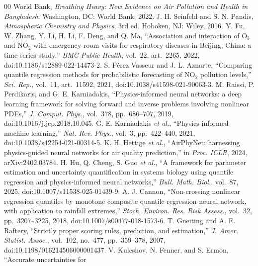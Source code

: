 \documentclass[conference]{IEEEtran}
\begin{document}
\scriptsize
\begin{thebibliography}{00}
\setlength{\itemsep}{0pt}\setlength{\parsep}{0pt}\setlength{\parskip}{0pt}
 World Bank, \emph{Breathing Heavy: New Evidence on Air Pollution
and Health in Bangladesh}. Washington, DC: World Bank, 2022.
 J. H. Seinfeld and S. N. Pandis, \emph{Atmospheric Chemistry and
Physics}, 3rd ed. Hoboken, NJ: Wiley, 2016.
 Y. Fu, W. Zhang, Y. Li, H. Li, F. Deng, and Q. Ma, ``Association and
interaction of $\mathrm{O_3}$ and $\mathrm{NO_2}$ with emergency room visits for
respiratory diseases in Beijing, China: a time-series study,'' \emph{BMC Public Health},
vol.~22, art.~2265, 2022, doi:10.1186/s12889-022-14473-2.
 S. P\'erez Vasseur and J. L. Aznarte, ``Comparing quantile
regression methods for probabilistic forecasting of $\mathrm{NO_2}$ pollution levels,''
\emph{Sci. Rep.}, vol.~11, art.~11592, 2021, doi:10.1038/s41598-021-90063-3.
 M. Raissi, P. Perdikaris, and G. E. Karniadakis, ``Physics-informed
neural networks: a deep learning framework for solving forward and inverse problems
involving nonlinear PDEs,'' \emph{J. Comput. Phys.}, vol.~378, pp.~686--707, 2019,
doi:10.1016/j.jcp.2018.10.045.
 G. E. Karniadakis \emph{et al.}, ``Physics-informed machine
learning,'' \emph{Nat. Rev. Phys.}, vol.~3, pp.~422--440, 2021,
doi:10.1038/s42254-021-00314-5.
 K. H. Hettige \emph{et al.}, ``AirPhyNet: harnessing physics-guided
neural networks for air quality prediction,'' in \emph{Proc. ICLR}, 2024,
arXiv:2402.03784.
 H. Hu, Q. Cheng, S. Guo \emph{et al.}, ``A framework for parameter
estimation and uncertainty quantification in systems biology using quantile regression and
physics-informed neural networks,'' \emph{Bull. Math. Biol.}, vol.~87, 2025,
doi:10.1007/s11538-025-01439-9.
 A. J. Cannon, ``Non-crossing nonlinear regression quantiles by
monotone composite quantile regression neural network, with application to rainfall
extremes,'' \emph{Stoch. Environ. Res. Risk Assess.}, vol.~32, pp.~3207--3225, 2018,
doi:10.1007/s00477-018-1573-6.
 T. Gneiting and A. E. Raftery, ``Strictly proper scoring rules,
prediction, and estimation,'' \emph{J. Amer. Statist. Assoc.}, vol.~102, no.~477,
pp.~359--378, 2007, doi:10.1198/016214506000001437.
 V. Kuleshov, N. Fenner, and S. Ermon, ``Accurate uncertainties for

\end{thebibliography}
\end{document}
